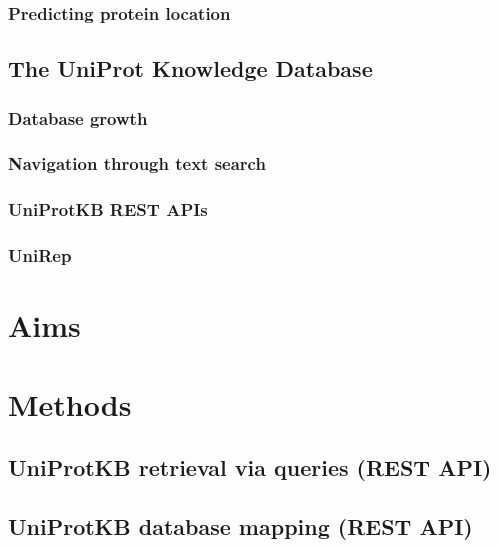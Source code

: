 \documentclass[a4paper]{article}
\begin{document}
		\subsubsection{Predicting protein location}
			
			
	\subsection{The UniProt Knowledge Database}
		
		\subsubsection{Database growth}
			
		\subsubsection{Navigation through text search}
			
		\subsubsection{UniProtKB REST APIs}
			
		\subsubsection{UniRep}
			
\newpage

\section{Aims}
	
\newpage

\section{Methods}
	
	\subsection{UniProtKB retrieval via queries (REST API)}
		
	\subsection{UniProtKB database mapping (REST API)}
		
\end{document}
